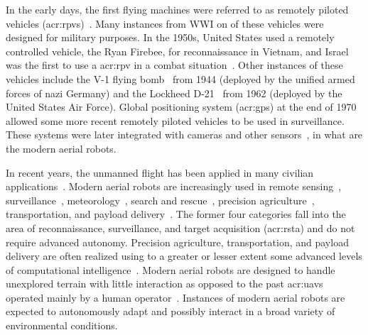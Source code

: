In the early days, the first flying machines were referred to as remotely piloted vehicles (\Gls{acr:rpv}s)~\citep{anderson2005introduction}. Many instances from WWI on of these vehicles were designed for military purposes. In the 1950s, United States used a remotely controlled vehicle, the Ryan Firebee, for reconnaissance in Vietnam, and Israel was the first to use a \Gls{acr:rpv} in a combat situation~\citep{anderson2005introduction}. Other instances of these vehicles include the V-1 flying bomb~ from 1944 (deployed by the unified armed forces of nazi Germany) and the Lockheed D-21~ from 1962 (deployed by the United States Air Force). Global positioning system (\Gls{acr:gps}) at the end of 1970 allowed some more recent remotely piloted vehicles to be used in surveillance. These systems were later integrated with cameras and other sensors~\citep{siciliano2016springer}, in what are the modern aerial robots.

In recent years, the unmanned flight has been applied in many civilian applications~\citep{gonzalez2017unmanned}. Modern aerial robots are increasingly used in remote sensing~\citep{noor2018remote,tang2015drone,milas2018drones}, surveillance~\citep{paucar2018use,burkle2009collaborating}, meteorology~\citep{schuyler2019using}, search and rescue~\citep{pensieri2020drones,karaca2018potential,cui2015drones,seguin2018unmanned}, precision agriculture~\citep{daponte2019review,puri2017agriculture}, transportation, and payload delivery~\citep{kellermann2020drones}. The former four categories fall into the area of reconnaissance, surveillance, and target acquisition (\Gls{acr:rsta}) and do not require advanced autonomy. Precision agriculture, transportation, and payload delivery are often realized using to a greater or lesser extent some advanced levels of computational intelligence~\citep{siciliano2016springer}. Modern aerial robots are designed to handle unexplored terrain with little interaction as opposed to the past \Gls{acr:uav}s operated mainly by a human operator~\citep{siciliano2016springer}. Instances of modern aerial robots are expected to autonomously adapt and possibly interact in a broad variety of environmental conditions. 

